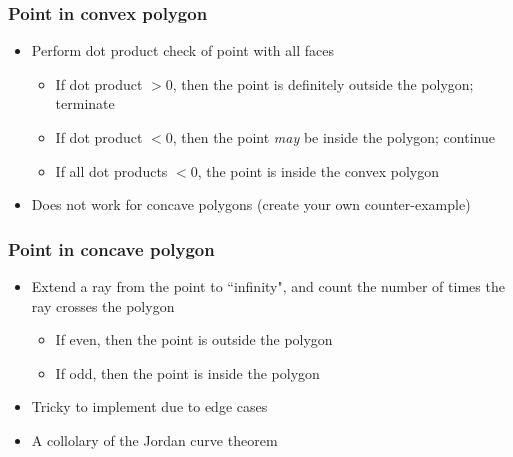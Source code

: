 \documentclass{beamer}
\begin{document}
\begin{frame}
 \frametitle{Point in convex polygon}
 \begin{itemize}
  \item Perform dot product check of point with all faces
  \begin{itemize}
   \item If dot product $> 0$, then the point is definitely outside the
         polygon; terminate
   \item If dot product $< 0$, then the point \emph{may} be inside the
         polygon; continue
   \item If all dot products $< 0$, the point is inside the convex
         polygon
  \end{itemize}
  \item Does not work for concave polygons (create your own
        counter-example)
 \end{itemize}
\end{frame}

\begin{frame}
 \frametitle{Point in concave polygon}
 \begin{itemize}
  \item Extend a ray from the point to ``infinity", and count the number
        of times the ray crosses the polygon
  \begin{itemize}
   \item If even, then the point is outside the polygon
   \item If odd, then the point is inside the polygon
  \end{itemize}
 \end{itemize}
 \begin{center}
  \scalebox{1.0} {
  }
 \end{center}
 \begin{itemize}
  \item Tricky to implement due to edge cases
  \item A collolary of the Jordan curve theorem
 \end{itemize}
\end{frame}
\end{document}
